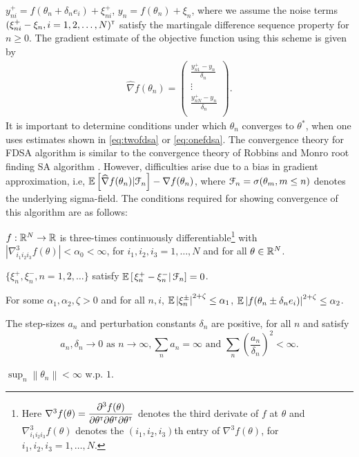 $y_{ni}^+ = f(\theta_n+\delta_n e_i) + \xi_{ni}^+$, $y_{n} = f(\theta_n) + \xi_n$,  where we assume the noise terms $(\xi_{ni}^+ - \xi_{n}, i=1,2,\ldots,N)^\mathsf{\scriptscriptstyle T}$ satisfy the martingale difference sequence property for $n \ge 0$. The gradient estimate of the objective function using this scheme is given by
\begin{align}\label{eq:onefdsa}
 \widehat{\nabla} f(\theta_{n}) = \left(
\begin{array}{c}
\frac{y_{n1}^+ - y_{n}}{\delta_n}\\
\vdots\\
\frac{y_{nN}^+ - y_{n}}{\delta_n}\\
\end{array}
\right).
\end{align}
It is important to determine conditions under which $\theta_n$ converges to $\theta^*$, when one uses estimates shown in \eqref{eq:twofdsa} or \eqref{eq:onefdsa}. The convergence theory for FDSA algorithm is similar to the convergence theory of Robbins and Monro root finding SA algorithm \cite{rm}. However, difficulties arise due to a bias in gradient approximation, i.e, $\mathbb{E} \left[\widehat{\nabla} f(\theta_{n})|\mathcal{F}_n \right] - \nabla f(\theta_{n}) $, where $\mathcal{F}_n = \sigma(\theta_m, m\le n)$ denotes the underlying sigma-field. The conditions required for showing convergence of this algorithm are as follows:
\begin{pvn}
\item $f:\mathbb{R}^N\rightarrow \mathbb{R}$ is three-times continuously differentiable\footnote{Here $\nabla^3 f(\theta) = \dfrac{\partial^3 f (\theta)}{\partial \theta^\mathsf{\scriptscriptstyle T} \partial \theta^\mathsf{\scriptscriptstyle T} \partial \theta^\mathsf{\scriptscriptstyle T}}$ denotes the third derivate of $f$ at $\theta$ and $\nabla^3_{i_1 i_2 i_3} f(\theta)$ denotes the $(i_1 ,i_2, i_3)$th entry of $\nabla^3 f(\theta)$, for $i_1, i_2, i_3=1,\ldots, N$.}  with $\left|\nabla^3_{i_1 i_2 i_3} f(\theta) \right| < \alpha_0 < \infty$, for $i_1, i_2, i_3=1,\ldots, N$ and for all $\theta\in \mathbb{R}^N$. 
\item $\{\xi_n^+,\xi_n^-, n=1,2,\ldots\}$ satisfy $\mathbb{E}\left[\left.\xi_n^+ - \xi_n^- \right| \mathcal{F}_n\right] = 0$.
\item For some $\alpha_1, \alpha_2, \zeta >0$ and for all $n,i$, 
$\mathbb{E} \left|\xi_n^{\pm}\right|^{2+\zeta} \le \alpha_1$, $\mathbb{E} \left|f(\theta_n\pm \delta_n e_i)\right|^{2+\zeta} \le \alpha_2$. 
\item The step-sizes $a_n$ and perturbation constants $\delta_n$ are positive, for all $n$ and satisfy
$$a_n, \delta_n \rightarrow 0\text{ as } n \rightarrow \infty, 
\sum_n a_n=\infty \text{ and } \sum_n \left(\frac{a_n}{\delta_n}\right)^2 <\infty.$$
\item $\sup_n \left\| \theta_n \right\| < \infty$ w.p. $1$.
\end{pvn}
